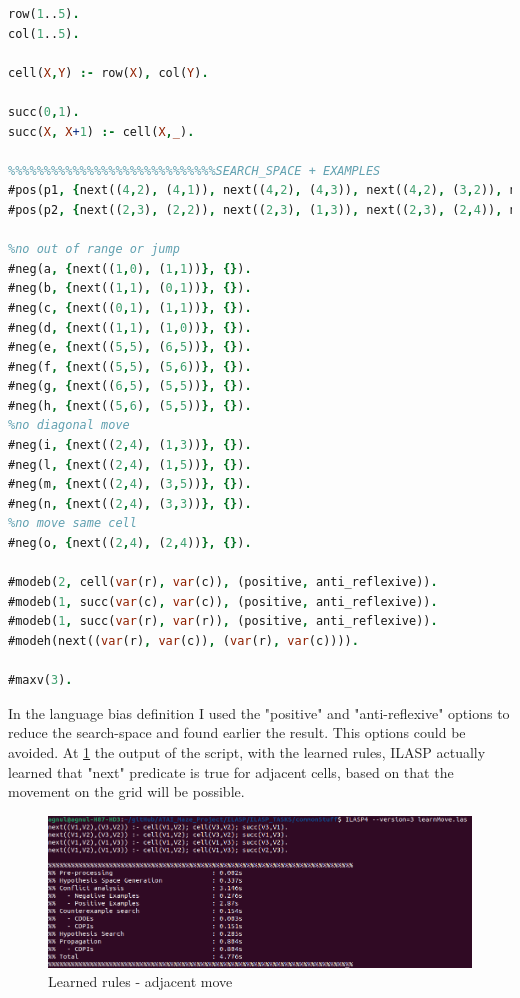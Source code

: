 \newpage
\begin{lstlisting}[language=Prolog]
%%%%%%%%%%%%%%%%%%%%%%%%learn how to move on near cells
row(1..5).
col(1..5).

cell(X,Y) :- row(X), col(Y).

succ(0,1).
succ(X, X+1) :- cell(X,_).

%%%%%%%%%%%%%%%%%%%%%%%%%%%%%SEARCH_SPACE + EXAMPLES
#pos(p1, {next((4,2), (4,1)), next((4,2), (4,3)), next((4,2), (3,2)), next((4,2), (5,2))}, {}).
#pos(p2, {next((2,3), (2,2)), next((2,3), (1,3)), next((2,3), (2,4)), next((2,3), (3,3))}, {}).

%no out of range or jump
#neg(a, {next((1,0), (1,1))}, {}).
#neg(b, {next((1,1), (0,1))}, {}).
#neg(c, {next((0,1), (1,1))}, {}).
#neg(d, {next((1,1), (1,0))}, {}).
#neg(e, {next((5,5), (6,5))}, {}).
#neg(f, {next((5,5), (5,6))}, {}).
#neg(g, {next((6,5), (5,5))}, {}).
#neg(h, {next((5,6), (5,5))}, {}).
%no diagonal move
#neg(i, {next((2,4), (1,3))}, {}).
#neg(l, {next((2,4), (1,5))}, {}).
#neg(m, {next((2,4), (3,5))}, {}).
#neg(n, {next((2,4), (3,3))}, {}).
%no move same cell
#neg(o, {next((2,4), (2,4))}, {}).

#modeb(2, cell(var(r), var(c)), (positive, anti_reflexive)).
#modeb(1, succ(var(c), var(c)), (positive, anti_reflexive)).
#modeb(1, succ(var(r), var(r)), (positive, anti_reflexive)).
#modeh(next((var(r), var(c)), (var(r), var(c)))).

#maxv(3).
\end{lstlisting}

In the language bias definition I used the "positive" and "anti-reflexive" options to reduce the search-space and found earlier the result. This options could be avoided.
At \ref{fig:asd} the output of the script, with the learned rules, ILASP actually learned that "next" predicate is true for adjacent cells, based on that the movement on the grid will be possible.

\begin{figure}
	\centering
	\includegraphics[scale=0.5]{img/learnMoveAdj.png}
	\caption{Learned rules - adjacent move}\label{fig:asd}
\end{figure}

